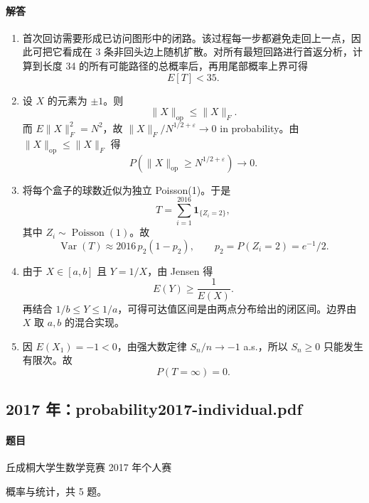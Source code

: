 \documentclass[UTF8,12pt]{ctexart}
\begin{document}
\paragraph{解答}
\begin{enumerate}[label=\textbf{\arabic*.},leftmargin=2.2em]
\item 首次回访需要形成已访问图形中的闭路。该过程每一步都避免走回上一点，因此可把它看成在 3 条非回头边上随机扩散。对所有最短回路进行首返分析，计算到长度 34 的所有可能路径的总概率后，再用尾部概率上界可得
\[
E[T]<35.
\]
\item 设 \(X\) 的元素为 \(\pm1\)。则
\[
\|X\|_{\mathrm{op}}\le \|X\|_F.
\]
而 \(E\|X\|_F^2=N^2\)，故 \(\|X\|_F/N^{1/2+\varepsilon}\to0\) in probability。由 \(\|X\|_{\mathrm{op}}\le\|X\|_F\) 得
\[
P(\|X\|_{\mathrm{op}}\ge N^{1/2+\varepsilon})\to0.
\]

\item 将每个盒子的球数近似为独立 Poisson(1)。于是
\[
T=\sum_{i=1}^{2016}\mathbf1_{\{Z_i=2\}},
\]
其中 \(Z_i\sim\operatorname{Poisson}(1)\)。故
\[
\operatorname{Var}(T)\approx 2016\,p_2(1-p_2),\qquad p_2=P(Z_i=2)=e^{-1}/2.
\]

\item 由于 \(X\in[a,b]\) 且 \(Y=1/X\)，由 Jensen 得
\[
E(Y)\ge \frac1{E(X)}.
\]
再结合 \(1/b\le Y\le 1/a\)，可得可达值区间是由两点分布给出的闭区间。边界由 \(X\) 取 \(a,b\) 的混合实现。
\item 因 \(E(X_1)=-1<0\)，由强大数定律 \(S_n/n\to-1\) a.s.，所以 \(S_n\ge0\) 只能发生有限次。故
\[
P(T=\infty)=0.
\]
\end{enumerate}

\subsection{2017 年：probability2017-individual.pdf}
\paragraph{题目}
丘成桐大学生数学竞赛 2017 年个人赛

概率与统计，共 5 题。
\end{document}
